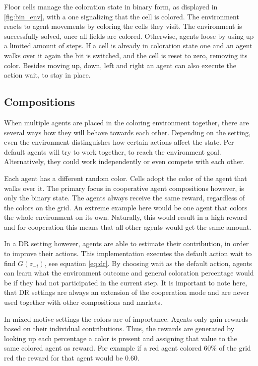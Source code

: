 Floor cells manage the coloration state in binary form, as displayed in \ref{fig:bin_env}, with a one signalizing that the cell is colored. The environment reacts to agent movements by coloring the cells they visit. The environment is successfully solved, once all fields are colored. Otherwise, agents loose by using up a limited amount of steps. If a cell is already in coloration state one and an agent walks over it again the bit is switched, and the cell is reset to zero, removing its color. Besides moving up, down, left and right an agent can also execute the action wait, to stay in place.

\subsection{Compositions}

When multiple agents are placed in the coloring environment together, there are several ways how they will behave towards each other. Depending on the setting, even the environment distinguishes how certain actions affect the state. Per default agents will try to work together, to reach the environment goal. Alternatively, they could work independently or even compete with each other.

Each agent has a different random color. Cells adopt the color of the agent that walks over it. The primary focus in cooperative agent compositions however, is only the binary state. The agents always receive the same reward, regardless of the colors on the grid. An extreme example here would be one agent that colors the whole environment on its own. Naturally, this would result in a high reward and for cooperation this means that all other agents would get the same amount. 

In a DR setting however, agents are able to estimate their contribution, in order to improve their actions. This implementation executes the default action wait to find $G(z_{-i})$, see equation \eqref{eq:dr}. By choosing wait as the default action, agents can learn what the environment outcome and general coloration percentage would be if they had not participated in the current step. It is important to note here, that DR settings are always an extension of the cooperation mode and are never used together with other compositions and markets.

In mixed-motive settings the colors are of importance. Agents only gain rewards based on their individual contributions. Thus, the rewards are generated by looking up each percentage a color is present and assigning that value to the same colored agent as reward. For example if a red agent colored 60\% of the grid red the reward for that agent would be 0.60. 

